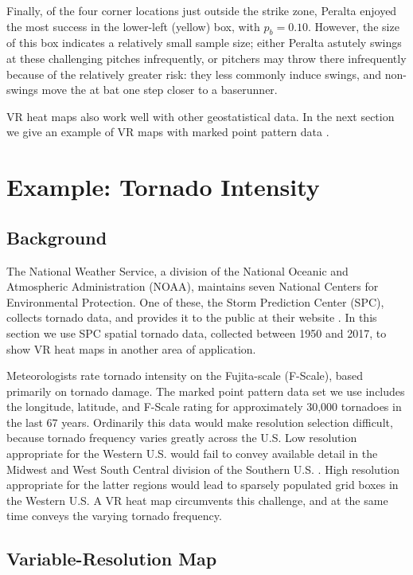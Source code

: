 Finally, of the four corner locations just outside the strike zone, Peralta enjoyed the most success in the lower-left (yellow) box, with $p_{b} = 0.10$. However, the size of this box indicates a relatively small sample size; either Peralta astutely swings at these challenging pitches infrequently, or pitchers may throw there infrequently because of the relatively greater risk: they less commonly induce swings, and non-swings move the at bat one step closer to a baserunner. 

VR heat maps also work well with other geostatistical data. In the next section we give an example of VR maps with marked point pattern data \citep{Schabenberger2004}.

\section{Example: Tornado Intensity} \label{ETI}

\subsection{Background}

The National Weather Service, a division of the National Oceanic and Atmospheric Administration (NOAA), maintains seven National Centers for Environmental Protection. One of these, the Storm Prediction Center (SPC), collects tornado data, and provides it to the public at their website \citep{NOAA}. In this section we use SPC spatial tornado data, collected between 1950 and 2017, to show VR heat maps in another area of application. 

Meteorologists rate tornado intensity on the Fujita-scale (F-Scale), based primarily on tornado damage. The marked point pattern data set we use includes the longitude, latitude, and F-Scale rating for approximately 30,000 tornadoes in the last 67 years. Ordinarily this data would make resolution selection difficult, because tornado frequency varies greatly across the U.S. Low resolution appropriate for the Western U.S. would fail to convey available detail in the Midwest and West South Central division of the Southern U.S. \citep{regions}. High resolution appropriate for the latter regions would lead to sparsely populated grid boxes in the Western U.S. A VR heat map circumvents this challenge, and at the same time conveys the varying tornado frequency. 

\subsection{Variable-Resolution Map}


